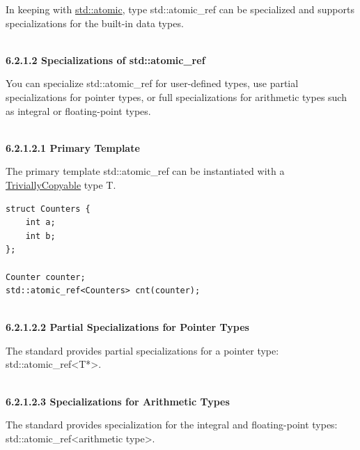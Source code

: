 In keeping with \href{https://en.cppreference.com/w/cpp/atomic/atomic}{std::atomic}, type std::atomic\_ref can be specialized and supports specializations for the built-in data types.

\hspace*{\fill} \\ %
\noindent
\textbf{6.2.1.2\hspace{0.2cm} Specializations of std::atomic\_ref}

You can specialize std::atomic\_ref for user-defined types, use partial specializations for pointer types, or full specializations for arithmetic types such as integral or floating-point types.

\hspace*{\fill} \\ %
\noindent
\textbf{6.2.1.2.1\hspace{0.2cm} Primary Template}

The primary template std::atomic\_ref can be instantiated with a \href{https://en.cppreference.com/w/cpp/types/is_trivially_copyable}{TriviallyCopyable} type T.

\begin{lstlisting}[style=styleCXX]
struct Counters {
	int a;
	int b;
};

Counter counter;
std::atomic_ref<Counters> cnt(counter);
\end{lstlisting}

\hspace*{\fill} \\ %
\noindent
\textbf{6.2.1.2.2\hspace{0.2cm} Partial Specializations for Pointer Types}

The standard provides partial specializations for a pointer type: std::atomic\_ref<T*>.

\hspace*{\fill} \\ %
\noindent
\textbf{6.2.1.2.3\hspace{0.2cm} Specializations for Arithmetic Types}

The standard provides specialization for the integral and floating-point types: std::atomic\_ref<arithmetic type>.

